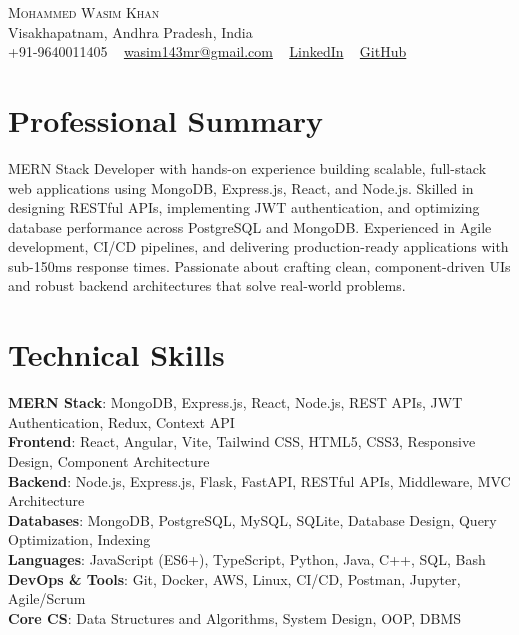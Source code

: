 \documentclass[letterpaper,11pt]{article}
\begin{document}
\begin{center}
  {\Huge \scshape Mohammed Wasim Khan} \\ \vspace{1pt}
  Visakhapatnam, Andhra Pradesh, India \\ \vspace{1pt}
  \small +91-9640011405 ~
  \href{mailto:wasim143mr@gmail.com}{wasim143mr@gmail.com} ~
  \href{https://linkedin.com/in/mohammed-wasim-khan-757595245}{LinkedIn} ~
  \href{https://github.com/wasim-builds}{GitHub}
  \vspace{-8pt}
\end{center}

\section{Professional Summary}
MERN Stack Developer with hands-on experience building scalable, full-stack web applications using MongoDB, Express.js, React, and Node.js. Skilled in designing RESTful APIs, implementing JWT authentication, and optimizing database performance across PostgreSQL and MongoDB. Experienced in Agile development, CI/CD pipelines, and delivering production-ready applications with sub-150ms response times. Passionate about crafting clean, component-driven UIs and robust backend architectures that solve real-world problems.

\section{Technical Skills}
\begin{itemize}[leftmargin=0.15in, label={}]
  \small{\item{
    \textbf{MERN Stack}{: MongoDB, Express.js, React, Node.js, REST APIs, JWT Authentication, Redux, Context API} \\
    \textbf{Frontend}{: React, Angular, Vite, Tailwind CSS, HTML5, CSS3, Responsive Design, Component Architecture} \\
    \textbf{Backend}{: Node.js, Express.js, Flask, FastAPI, RESTful APIs, Middleware, MVC Architecture} \\
    \textbf{Databases}{: MongoDB, PostgreSQL, MySQL, SQLite, Database Design, Query Optimization, Indexing} \\
    \textbf{Languages}{: JavaScript (ES6+), TypeScript, Python, Java, C++, SQL, Bash} \\
    \textbf{DevOps \& Tools}{: Git, Docker, AWS, Linux, CI/CD, Postman, Jupyter, Agile/Scrum} \\
    \textbf{Core CS}{: Data Structures and Algorithms, System Design, OOP, DBMS}
  }}
\end{itemize}
\vspace{-16pt}
\end{document}
